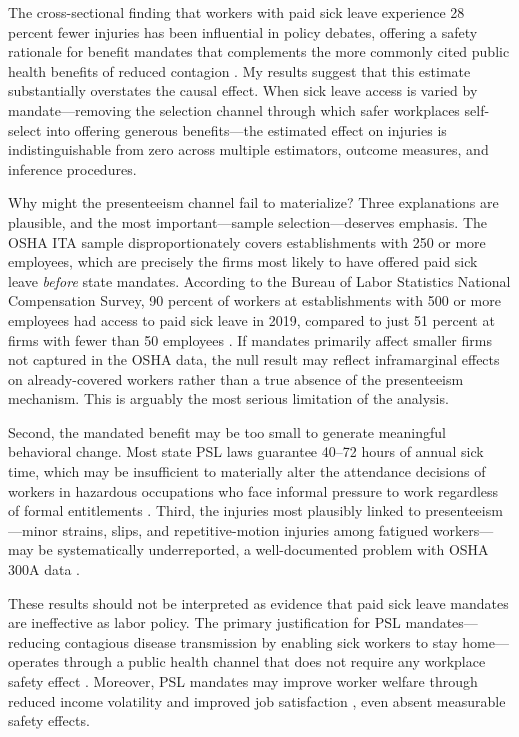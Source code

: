 \documentclass[12pt]{article}
\begin{document}
The cross-sectional finding that workers with paid sick leave experience 28 percent fewer injuries \citep{asfaw2012} has been influential in policy debates, offering a safety rationale for benefit mandates that complements the more commonly cited public health benefits of reduced contagion \citep{stearns2015, pichler2020}. My results suggest that this estimate substantially overstates the causal effect. When sick leave access is varied by mandate---removing the selection channel through which safer workplaces self-select into offering generous benefits---the estimated effect on injuries is indistinguishable from zero across multiple estimators, outcome measures, and inference procedures.

Why might the presenteeism channel fail to materialize? Three explanations are plausible, and the most important---sample selection---deserves emphasis. The OSHA ITA sample disproportionately covers establishments with 250 or more employees, which are precisely the firms most likely to have offered paid sick leave \textit{before} state mandates. According to the Bureau of Labor Statistics National Compensation Survey, 90 percent of workers at establishments with 500 or more employees had access to paid sick leave in 2019, compared to just 51 percent at firms with fewer than 50 employees \citep{bls2019}. If mandates primarily affect smaller firms not captured in the OSHA data, the null result may reflect inframarginal effects on already-covered workers rather than a true absence of the presenteeism mechanism. This is arguably the most serious limitation of the analysis.

Second, the mandated benefit may be too small to generate meaningful behavioral change. Most state PSL laws guarantee 40--72 hours of annual sick time, which may be insufficient to materially alter the attendance decisions of workers in hazardous occupations who face informal pressure to work regardless of formal entitlements \citep{drago2011}. Third, the injuries most plausibly linked to presenteeism---minor strains, slips, and repetitive-motion injuries among fatigued workers---may be systematically underreported, a well-documented problem with OSHA 300A data \citep{rosenman2006, boden2012}.

These results should not be interpreted as evidence that paid sick leave mandates are ineffective as labor policy. The primary justification for PSL mandates---reducing contagious disease transmission by enabling sick workers to stay home---operates through a public health channel that does not require any workplace safety effect \citep{pichler2020}. Moreover, PSL mandates may improve worker welfare through reduced income volatility and improved job satisfaction \citep{deangelis2023}, even absent measurable safety effects.
\end{document}
